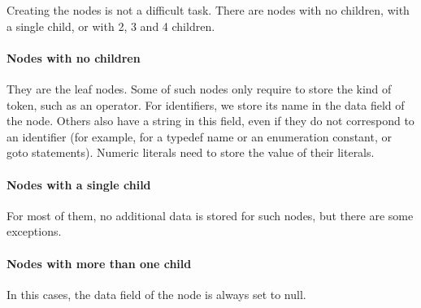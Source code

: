 \documentclass[a4paper,openany]{article}
\begin{document}
Creating the nodes is not a difficult task. There are nodes with no children, with a single child, or with 2, 3 and 4 children.

\paragraph{Nodes with no children}
They are the leaf nodes. Some of such nodes only require to store the kind of token, such as an operator. For identifiers, we store its name in the data field of the node. Others also have a string in this field, even if they do not correspond to an identifier (for example, for a typedef name or an enumeration constant, or goto statements). Numeric literals need to store the value of their literals.

\paragraph{Nodes with a single child}
For most of them, no additional data is stored for such nodes, but there are some exceptions.

\paragraph{Nodes with more than one child}
In this cases, the data field of the node is always set to null.
\end{document}
